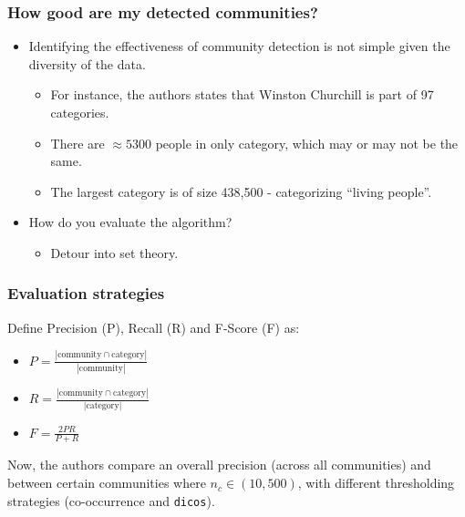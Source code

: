 \documentclass[10pt, compress]{beamer}
\begin{document}
\begin{frame}[fragile]
	\frametitle{\normalsize How good are my detected communities?}
\begin{itemize}
\item Identifying the effectiveness of community detection is not simple given the diversity of the data.
\begin{itemize}
	\item For instance, the authors states that Winston Churchill is part of 97 categories.
    \item There are \(\approx 5300\) people in only category, which may or may not be the same.
    \item The largest category is of size 438,500 - categorizing ``living people''.
\end{itemize}
\item How do you evaluate the algorithm?
\begin{itemize}
	\item Detour into set theory.
\end{itemize}
\end{itemize}
\end{frame}

\begin{frame}[fragile]
	\frametitle{Evaluation strategies}
\vspace{-15mm}
Define Precision (P), Recall (R) and F-Score (F) as:
\begin{itemize}
\item \(\displaystyle P = \frac{|\text{community} \cap \text{category}|}{|\text{community}|}\)
\item \(\displaystyle R = \frac{|\text{community} \cap \text{category}|}{|\text{category}|}\)
\item \(\displaystyle F = \frac{2PR}{P + R}\)
\end{itemize}
\begin{center}
Now, the authors compare an overall precision (across all communities) and between certain communities where \(n_{c} \in (10, 500)\), with different thresholding strategies (co-occurrence and \texttt{dicos}).
\end{center}
\end{frame}
\end{document}
